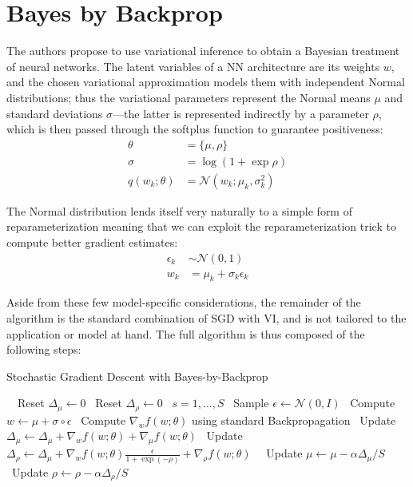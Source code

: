 \documentclass[11pt]{article}
\begin{document}
\section{Bayes by Backprop}\label{sec:bayes_by_backprop}

The authors propose to use variational inference to obtain a Bayesian treatment
of neural networks.  The latent variables of a NN architecture are its weights
$w$, and the chosen variational approximation models them with independent
Normal distributions;  thus the variational parameters represent the Normal
means $\mu$ and standard deviations $\sigma$---the latter is represented
indirectly by a parameter $\rho$, which is then passed through the softplus
function to guarantee positiveness:
%
\begin{align}
  \theta &= \{ \mu, \rho \} \\
  \sigma &= \log(1 + \exp\rho) \\
  q(w_k; \theta) &= \mathcal{N}(w_k; \mu_k, \sigma_k^2)
\end{align}


The Normal distribution lends itself very naturally to a simple form of
reparameterization meaning that we can exploit the reparameterization trick to
compute better gradient estimates:
%
\begin{align}
  \epsilon_k &\sim \mathcal{N}(0, 1) \\
  w_k &= \mu_k + \sigma_k \epsilon_k
\end{align}

Aside from these few model-specific considerations, the remainder of the
algorithm is the standard combination of SGD with VI, and is not tailored to
the application or model at hand.  The full algorithm is thus composed of the
following steps:

\begin{algorithm}
\caption{Stochastic Gradient Descent with Bayes-by-Backprop}
\begin{algorithmic}[1]
  \Repeat\
  \State\ Reset $\Delta_\mu \gets 0$
  \State\ Reset $\Delta_\rho \gets 0$
  \For\ {$s = 1, \ldots, S$}
  \State\ Sample $\epsilon \gets \mathcal{N}(0, I)$
  \State\ Compute $w \gets \mu + \sigma \circ \epsilon$
  \State\ Compute $\nabla_w f(w; \theta)$ using standard Backpropagation
  \State\ Update $\Delta_\mu \gets \Delta_\mu + \nabla_w f(w; \theta) + \nabla_\mu f(w; \theta)$
  \State\ Update $\Delta_\rho \gets \Delta_\mu + \nabla_w f(w; \theta) \frac{\epsilon}{1+\exp(-\rho)} + \nabla_\rho f(w; \theta)$
  \EndFor\
  \State\ Update $\mu \gets \mu - \alpha \Delta_\mu / S$
  \State\ Update $\rho \gets \rho - \alpha \Delta_\rho / S$
  \Until{Convergence}
\end{algorithmic}
\end{algorithm}
\end{document}
